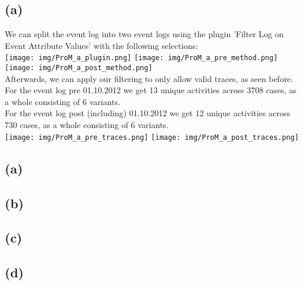 \documentclass[../../main.tex]{subfiles}
\begin{document}
\subsection*{(a)}
We can split the event log into two event logs using the plugin 'Filter Log on Event Attribute Values' with the following selections:\\
\texttt{[image: img/ProM\_a\_plugin.png]}
\texttt{[image: img/ProM\_a\_pre\_method.png]}
\texttt{[image: img/ProM\_a\_post\_method.png]}\\
Afterwards, we can apply our filtering to only allow valid traces, as seen before.\\

For the event log pre 01.10.2012 we get 13 unique activities across 3708 cases, as a whole consisting of 6 variants. \\
For the event log post (including) 01.10.2012 we get 12 unique activities across 730 cases, as a whole consisting of 6 variants. \\
\texttt{[image: img/ProM\_a\_pre\_traces.png]}
\texttt{[image: img/ProM\_a\_post\_traces.png]}\\


\subsection*{(a)}


\subsection*{(b)}


\subsection*{(c)}


\subsection*{(d)}
\end{document}
